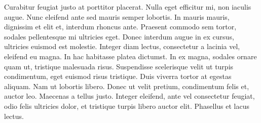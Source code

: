 	Curabitur feugiat justo at porttitor placerat. Nulla eget efficitur mi, non iaculis augue. Nunc eleifend ante sed mauris semper lobortis. In mauris mauris, dignissim et elit et, interdum rhoncus ante. Praesent commodo sem tortor, sodales pellentesque mi ultricies eget. Donec interdum augue in ex cursus, ultricies euismod est molestie. Integer diam lectus, consectetur a lacinia vel, eleifend eu magna. In hac habitasse platea dictumst. In ex magna, sodales ornare quam ut, tristique malesuada risus. Suspendisse scelerisque velit ut turpis condimentum, eget euismod risus tristique. Duis viverra tortor at egestas aliquam. Nam ut lobortis libero. Donec ut velit pretium, condimentum felis et, auctor leo. Maecenas a tellus justo. Integer eleifend, ante vel consectetur feugiat, odio felis ultricies dolor, et tristique turpis libero auctor elit. Phasellus et lacus lectus.   

	





